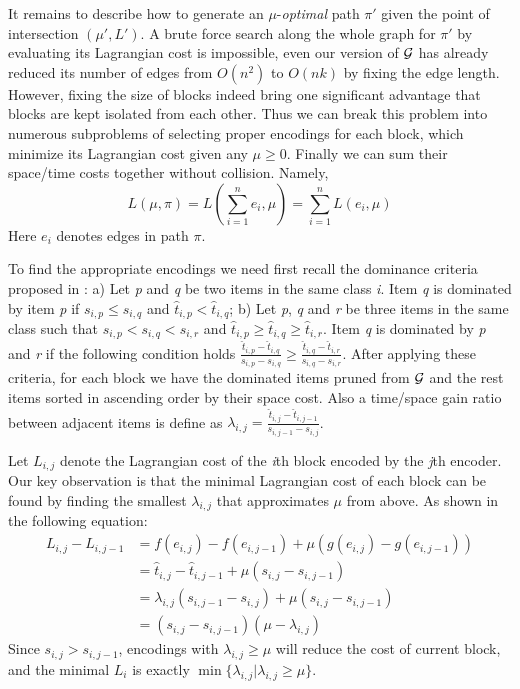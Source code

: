 \documentclass{sig-alternate-05-2015}
\begin{document}
It remains to describe how to generate an $ \mu $-\textit{optimal} path $ \pi' $ given the point of intersection $ (\mu',L') $.
A brute force search along the whole graph for $ \pi' $ by evaluating its Lagrangian cost is impossible,
even our version of  $ \cal G $ has already reduced its number of edges from $ O(n^2) $ to $ O(nk) $ by fixing the edge length.
However, fixing the size of blocks indeed bring one significant advantage that blocks are kept isolated from each other.
Thus we can break this problem into numerous subproblems of selecting proper encodings for each block, which minimize its Lagrangian cost given any $ \mu \geqslant 0 $.
Finally we can sum their space/time costs together without collision.
Namely,
\begin{equation*}
L(\mu,\pi) = L(\sum_{i=1}^{n} e_i, \mu)=\sum_{i=1}^{n}L(e_i,\mu)
\end{equation*}
Here $ e_i $ denotes edges in path $ \pi $.

To find the appropriate encodings we need first recall the dominance criteria proposed in \cite{ottaviano2015optimal}: a) Let \textit{p} and \textit{q} be two items in the same class \textit{i}.
Item \textit{q} is dominated by item \textit{p} if $ s_{i,p} \leqslant s_{i,q} $ and $ \hat{t}_{i,p} < \hat{t}_{i,q} $;
b) Let \textit{p}, \textit{q} and \textit{r} be three items in the same class such that $ s_{i,p} < s_{i,q} < s_{i,r} $ and $ \hat{t}_{i,p} \geqslant \hat{t}_{i,q} \geqslant \hat{t}_{i,r} $.
Item \textit{q} is dominated by \textit{p} and \textit{r} if the following condition holds $ \frac{\hat{t}_{i,p} - \hat{t}_{i,q}}{s_{i,p} - s_{i,q}} \geqslant \frac{\hat{t}_{i,q} - \hat{t}_{i,r}}{s_{i,q} - s_{i,r}} $.
After applying these criteria, for each block we have the dominated items pruned from $ \cal G $ and the rest items sorted in ascending order by their space cost.
Also a time/space gain ratio between adjacent items is define as $ \lambda_{i,j} = \frac{\hat{t}_{i,j} - \hat{t}_{i,j-1}}{s_{i,j-1} - s_{i,j}} $.

Let $ L_{i,j} $ denote the Lagrangian cost of the \textit{i}th block encoded by the \textit{j}th encoder.
Our key observation is that the minimal Lagrangian cost of each block can be found by finding the smallest $ \lambda_{i,j} $ that approximates $ \mu $ from above.
As shown in the following equation:
\begin{equation}
\begin{split}
L_{i,j} - L_{i,j-1} &= f(e_{i,j}) - f(e_{i,j-1}) + \mu (g(e_{i,j}) - g(e_{i,j-1})) \\
	&= \hat{t}_{i,j} - \hat{t}_{i,j-1} + \mu (s_{i,j} - s_{i,j-1}) \\
	&= \lambda_{i,j}(s_{i,j-1} - s_{i,j}) + \mu (s_{i,j} - s_{i,j-1}) \\
	&= (s_{i,j} - s_{i,j-1})(\mu - \lambda_{i,j})
\end{split}
\end{equation}
Since $ s_{i,j} > s_{i,j-1} $, encodings with $ \lambda_{i,j} \geqslant \mu $ will reduce the cost of current block,
and the minimal $ L_i $ is exactly $\min\{ \lambda_{i,j}| \lambda_{i,j} \geqslant \mu \}  $.
\end{document}
